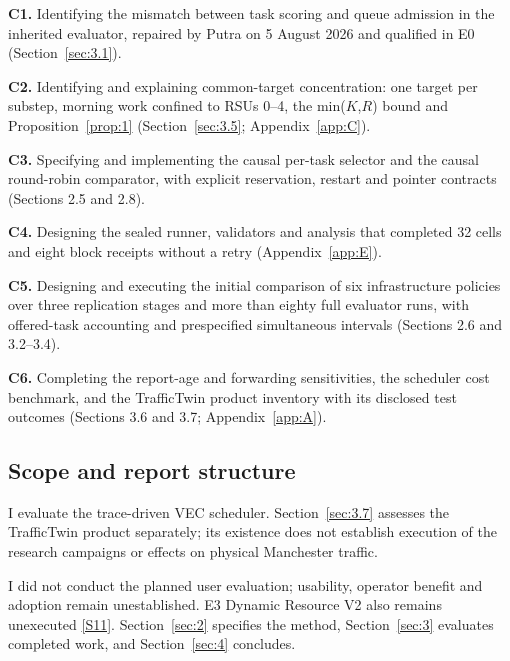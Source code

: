 \documentclass[12pt,a4paper]{article}
\begin{document}
\textbf{C1.} Identifying the mismatch between task scoring and queue admission in the inherited evaluator, repaired by Putra on 5 August 2026 and qualified in E0 (Section~\ref{sec:3.1}).

\textbf{C2.} Identifying and explaining common-target concentration: one target per substep, morning work confined to RSUs 0--4, the min($K$,$R$) bound and Proposition~\ref{prop:1} (Section~\ref{sec:3.5}; Appendix~\ref{app:C}).

\textbf{C3.} Specifying and implementing the causal per-task selector and the causal round-robin comparator, with explicit reservation, restart and pointer contracts (Sections 2.5 and 2.8).

\textbf{C4.} Designing the sealed runner, validators and analysis that completed 32 cells and eight block receipts without a retry (Appendix~\ref{app:E}).

\textbf{C5.} Designing and executing the initial comparison of six infrastructure policies over three replication stages and more than eighty full evaluator runs, with offered-task accounting and prespecified simultaneous intervals (Sections 2.6 and 3.2--3.4).

\textbf{C6.} Completing the report-age and forwarding sensitivities, the scheduler cost benchmark, and the TrafficTwin product inventory with its disclosed test outcomes (Sections 3.6 and 3.7; Appendix~\ref{app:A}).

\FloatBarrier
\subsection{Scope and report structure}\label{sec:1.4}

I evaluate the trace-driven VEC scheduler. Section~\ref{sec:3.7} assesses the TrafficTwin product separately; its existence does not establish execution of the research campaigns or effects on physical Manchester traffic.

I did not conduct the planned user evaluation; usability, operator benefit and adoption remain unestablished. E3 Dynamic Resource V2 also remains unexecuted \hyperref[source-s11]{[S11]}. Section~\ref{sec:2} specifies the method, Section~\ref{sec:3} evaluates completed work, and Section~\ref{sec:4} concludes.
\end{document}
